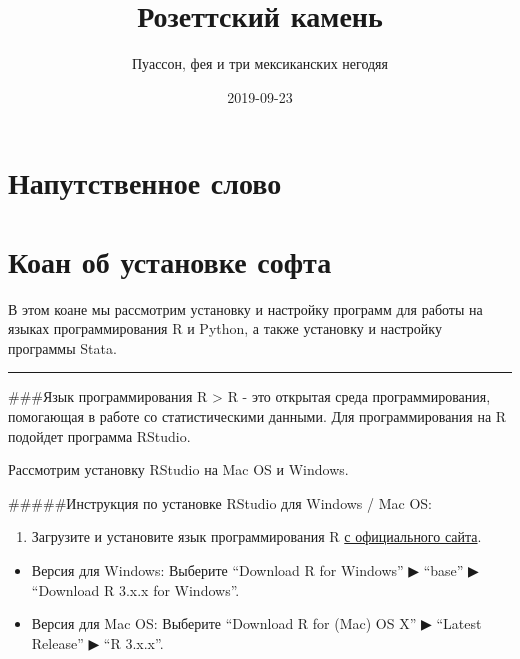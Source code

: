 \documentclass[]{book}
\title{Розеттский камень}
\author{Пуассон, фея и три мексиканских негодяя}
\date{2019-09-23}
\providecommand{\tightlist}{%
  \setlength{\itemsep}{0pt}\setlength{\parskip}{0pt}}
\begin{document}
\maketitle

{
\setcounter{tocdepth}{1}
\tableofcontents
}
\hypertarget{-}{%
\chapter{Напутственное слово}\label{-}}

\hypertarget{installsoft}{%
\chapter{Коан об установке софта}\label{installsoft}}

В этом коане мы рассмотрим установку и настройку программ для работы на языках программирования R и Python, а также установку и настройку программы Stata.

\begin{center}\rule{0.5\linewidth}{\linethickness}\end{center}

\#\#\#Язык программирования R
\textgreater{} R - это открытая среда программирования, помогающая в работе со статистическими данными. Для программирования на R подойдет программа RStudio.

Рассмотрим установку RStudio на Mac OS и Windows.

\#\#\#\#\#Инструкция по установке RStudio для Windows / Mac OS:

\begin{enumerate}
\def\labelenumi{\arabic{enumi}.}
\tightlist
\item
  Загрузите и установите язык программирования R \href{http://cran.cnr.berkeley.edu/}{с официального сайта}.
\end{enumerate}

\begin{itemize}
\item
  Версия для Windows: Выберите ``Download R for Windows'' ▶ ``base'' ▶ ``Download R 3.x.x for Windows''.
\item
  Версия для Mac OS: Выберите ``Download R for (Mac) OS X'' ▶ ``Latest Release'' ▶ ``R 3.x.x''.
\end{itemize}
\end{document}
